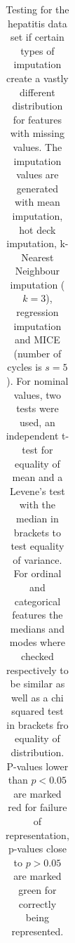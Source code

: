 \documentclass[10pt,a4paper]{report}
\begin{document}
	\begin{table}
		\caption{Testing for the hepatitis data set if certain types of imputation create a vastly different distribution for features with missing values. The imputation values are generated with mean imputation, hot deck imputation, k-Nearest Neighbour imputation ($k = 3$), regression imputation and MICE (number of cycles is $s = 5$). For nominal values, two tests were used, an independent t-test for equality of mean and a Levene's test with the median in brackets to test equality of variance. For ordinal and categorical features the medians and modes where checked respectively to be similar as well as a chi squared test in brackets fro equality of distribution. P-values lower than $p < 0.05$ are marked red for failure of representation, p-values close to $p > 0.05$ are marked green for correctly being represented.}
		\label{tab:ImputationHepatitis}
		\begin{tabular}{l|lll|lll|lll|lll|lll}

\end{tabular}
\end{table}
\end{document}

